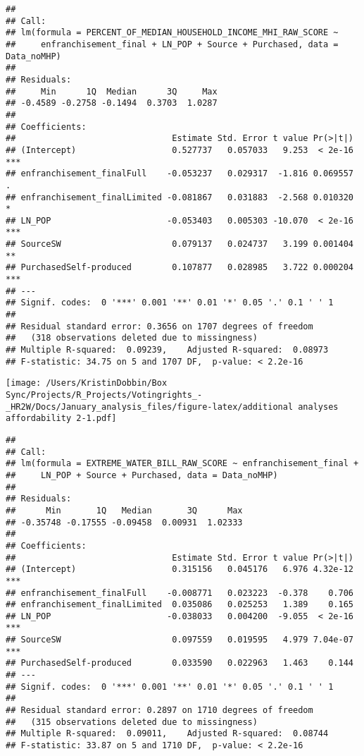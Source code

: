 \documentclass[
]{article}
\begin{document}
\begin{verbatim}
## 
## Call:
## lm(formula = PERCENT_OF_MEDIAN_HOUSEHOLD_INCOME_MHI_RAW_SCORE ~ 
##     enfranchisement_final + LN_POP + Source + Purchased, data = Data_noMHP)
## 
## Residuals:
##     Min      1Q  Median      3Q     Max 
## -0.4589 -0.2758 -0.1494  0.3703  1.0287 
## 
## Coefficients:
##                               Estimate Std. Error t value Pr(>|t|)    
## (Intercept)                   0.527737   0.057033   9.253  < 2e-16 ***
## enfranchisement_finalFull    -0.053237   0.029317  -1.816 0.069557 .  
## enfranchisement_finalLimited -0.081867   0.031883  -2.568 0.010320 *  
## LN_POP                       -0.053403   0.005303 -10.070  < 2e-16 ***
## SourceSW                      0.079137   0.024737   3.199 0.001404 ** 
## PurchasedSelf-produced        0.107877   0.028985   3.722 0.000204 ***
## ---
## Signif. codes:  0 '***' 0.001 '**' 0.01 '*' 0.05 '.' 0.1 ' ' 1
## 
## Residual standard error: 0.3656 on 1707 degrees of freedom
##   (318 observations deleted due to missingness)
## Multiple R-squared:  0.09239,    Adjusted R-squared:  0.08973 
## F-statistic: 34.75 on 5 and 1707 DF,  p-value: < 2.2e-16
\end{verbatim}

\texttt{[image: /Users/KristinDobbin/Box Sync/Projects/R\_Projects/Votingrights\_-\_HR2W/Docs/January\_analysis\_files/figure-latex/additional analyses affordability 2-1.pdf]}

\begin{verbatim}
## 
## Call:
## lm(formula = EXTREME_WATER_BILL_RAW_SCORE ~ enfranchisement_final + 
##     LN_POP + Source + Purchased, data = Data_noMHP)
## 
## Residuals:
##      Min       1Q   Median       3Q      Max 
## -0.35748 -0.17555 -0.09458  0.00931  1.02333 
## 
## Coefficients:
##                               Estimate Std. Error t value Pr(>|t|)    
## (Intercept)                   0.315156   0.045176   6.976 4.32e-12 ***
## enfranchisement_finalFull    -0.008771   0.023223  -0.378    0.706    
## enfranchisement_finalLimited  0.035086   0.025253   1.389    0.165    
## LN_POP                       -0.038033   0.004200  -9.055  < 2e-16 ***
## SourceSW                      0.097559   0.019595   4.979 7.04e-07 ***
## PurchasedSelf-produced        0.033590   0.022963   1.463    0.144    
## ---
## Signif. codes:  0 '***' 0.001 '**' 0.01 '*' 0.05 '.' 0.1 ' ' 1
## 
## Residual standard error: 0.2897 on 1710 degrees of freedom
##   (315 observations deleted due to missingness)
## Multiple R-squared:  0.09011,    Adjusted R-squared:  0.08744 
## F-statistic: 33.87 on 5 and 1710 DF,  p-value: < 2.2e-16
\end{verbatim}
\end{document}
